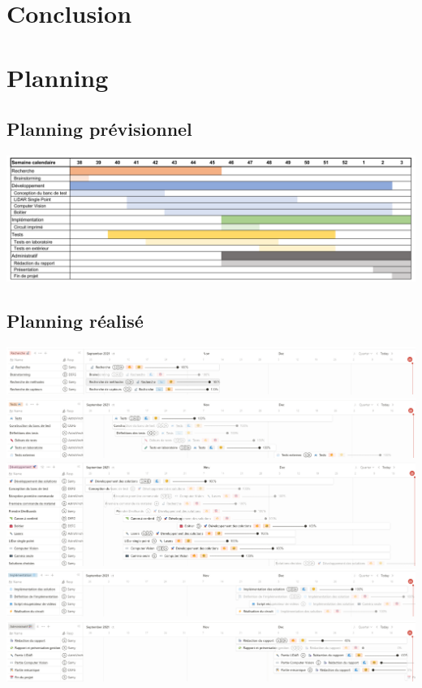 \documentclass[11pt,titlepage]{report}
\begin{document}
\chapter{Conclusion}


\appendix

\chapter{Planning}
\label{app:planning}
\section{Planning prévisionnel}
\includegraphics[angle=90, height=0.75\textheight]{Images/business/planning/prevu.PNG}
\section{Planning réalisé}
\includegraphics[angle=90, height=0.95\textheight]{Images/business/planning/research.PNG}
\includegraphics[angle=90, height=0.95\textheight]{Images/business/planning/tests.PNG}
\includegraphics[angle=90, height=0.95\textheight]{Images/business/planning/dev.PNG}\newpage
\includegraphics[angle=90, height=0.95\textheight]{Images/business/planning/implementation.PNG}
\includegraphics[angle=90, height=0.95\textheight]{Images/business/planning/admin.PNG}
\end{document}
